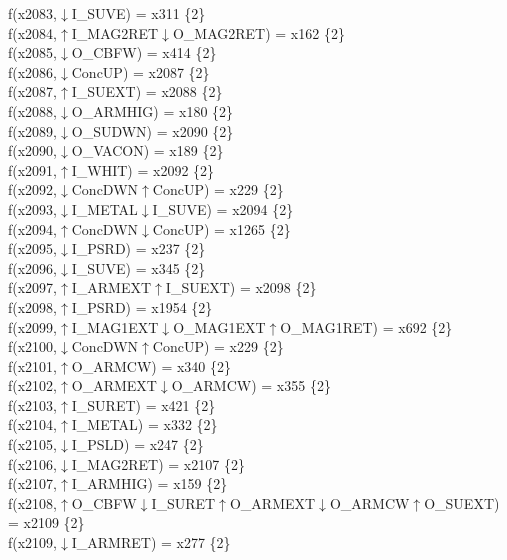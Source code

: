 f(x2083,$\downarrow$I\_SUVE) = x311 \{2\} \\  
f(x2084,$\uparrow$I\_MAG2RET$\downarrow$O\_MAG2RET) = x162 \{2\} \\  
f(x2085,$\downarrow$O\_CBFW) = x414 \{2\} \\  
f(x2086,$\downarrow$ConcUP) = x2087 \{2\} \\  
f(x2087,$\uparrow$I\_SUEXT) = x2088 \{2\} \\  
f(x2088,$\downarrow$O\_ARMHIG) = x180 \{2\} \\  
f(x2089,$\downarrow$O\_SUDWN) = x2090 \{2\} \\  
f(x2090,$\downarrow$O\_VACON) = x189 \{2\} \\  
f(x2091,$\uparrow$I\_WHIT) = x2092 \{2\} \\  
f(x2092,$\downarrow$ConcDWN$\uparrow$ConcUP) = x229 \{2\} \\  
f(x2093,$\downarrow$I\_METAL$\downarrow$I\_SUVE) = x2094 \{2\} \\  
f(x2094,$\uparrow$ConcDWN$\downarrow$ConcUP) = x1265 \{2\} \\  
f(x2095,$\downarrow$I\_PSRD) = x237 \{2\} \\  
f(x2096,$\downarrow$I\_SUVE) = x345 \{2\} \\  
f(x2097,$\uparrow$I\_ARMEXT$\uparrow$I\_SUEXT) = x2098 \{2\} \\  
f(x2098,$\uparrow$I\_PSRD) = x1954 \{2\} \\  
f(x2099,$\uparrow$I\_MAG1EXT$\downarrow$O\_MAG1EXT$\uparrow$O\_MAG1RET) = x692 \{2\} \\  
f(x2100,$\downarrow$ConcDWN$\uparrow$ConcUP) = x229 \{2\} \\  
f(x2101,$\uparrow$O\_ARMCW) = x340 \{2\} \\  
f(x2102,$\uparrow$O\_ARMEXT$\downarrow$O\_ARMCW) = x355 \{2\} \\  
f(x2103,$\uparrow$I\_SURET) = x421 \{2\} \\  
f(x2104,$\uparrow$I\_METAL) = x332 \{2\} \\  
f(x2105,$\downarrow$I\_PSLD) = x247 \{2\} \\  
f(x2106,$\downarrow$I\_MAG2RET) = x2107 \{2\} \\  
f(x2107,$\uparrow$I\_ARMHIG) = x159 \{2\} \\  
f(x2108,$\uparrow$O\_CBFW$\downarrow$I\_SURET$\uparrow$O\_ARMEXT$\downarrow$O\_ARMCW$\uparrow$O\_SUEXT) = x2109 \{2\} \\  
f(x2109,$\downarrow$I\_ARMRET) = x277 \{2\} \\  

